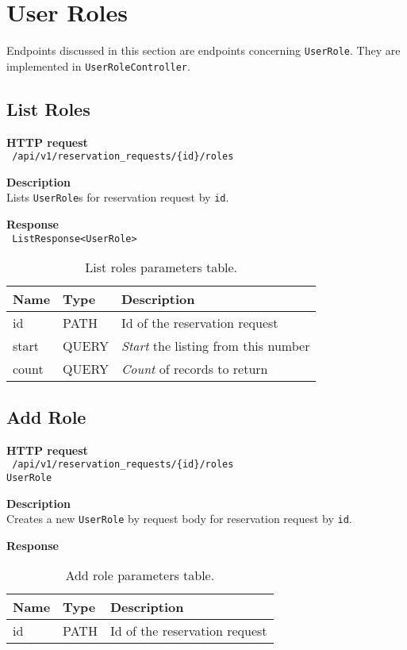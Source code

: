 \section{User Roles}
Endpoints discussed in this section are endpoints concerning \texttt{UserRole}.
They are implemented in \texttt{UserRoleController}.
\subsection{List Roles}
\begin{description}
    \item \textbf{HTTP request}\\
        \texttt{\text{[GET]} /api/v1/reservation\_requests/\{id\}/roles}
    \item \textbf{Description}\\
        Lists \texttt{UserRole}s for reservation request by \texttt{id}.
    \item \textbf{Response}\\
        \texttt{\text{[200 OK]} ListResponse<UserRole>}
\end{description}
\begin{table}[ht!]
    \begin{tabularx}{\textwidth}{llX}
        \toprule
        Name & Type & Description \\
        \midrule
        id & PATH & Id of the reservation request \\ 
        start & QUERY & \emph{Start} the listing from this number \\  
        count & QUERY & \emph{Count} of records to return
        \end{tabularx}
    \caption{List roles parameters table.}
\end{table}

\subsection{Add Role}
\begin{description}
    \item \textbf{HTTP request}\\
        \texttt{\text{[POST]} /api/v1/reservation\_requests/\{id\}/roles}\\
        \texttt{UserRole}
    \item \textbf{Description}\\
        Creates a new \texttt{UserRole} by request body for reservation request by \texttt{id}.
    \item \textbf{Response}\\
        \texttt{\text{[200 OK]}}
\end{description}
\begin{table}[ht!]
    \begin{tabularx}{\textwidth}{llX}
        \toprule
        Name & Type & Description \\
        \midrule
        id & PATH & Id of the reservation request \\ 
        \end{tabularx}
    \caption{Add role parameters table.}
\end{table}

